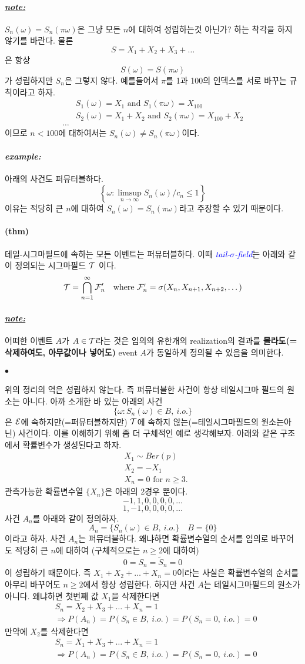 \documentclass[12pt,oneside,english]{book}
\def\ck{\paragraph{\Large$\bullet$}\Large}
\def\note{\paragraph{\Large\textit{\underline{note:}}}\Large}
\def\ex{\paragraph{\Large\textit{example:}}\Large}
\newcommand{\para}[1]{\paragraph{\Large(#1)}\Large}
\begin{document}
\note $S_n(\omega)=S_n(\pi\omega)$은 그냥 모든 $n$에 대하여 성립하는것 아닌가? 하는 착각을 하지 않기를 바란다. 물론 
\[
S=X_1+X_2+X_3+\dots
\]
은 항상 
\[
S(\omega)=S(\pi\omega)
\]가 성립하지만 $S_n$은 그렇지 않다. 예를들어서 $\pi$를 1과 100의 인덱스를 서로 바꾸는 규칙이라고 하자. 
\begin{align*}
& S_1(\omega)=X_1 \mbox{ and } S_1(\pi\omega)=X_{100} \\& S_2(\omega)=X_1+X_2 \mbox{ and } S_2(\pi\omega)=X_{100}+X_2 \\
\dots
\end{align*}
이므로 $n<100$에 대하여서는 $S_n(\omega)\neq S_n(\pi\omega)$이다. 

\ex 아래의 사건도 퍼뮤터블하다. 
\[
\left\{\omega:\limsup_{n\to\infty}S_n(\omega)/c_n \leq 1\right\}
\]
이유는 적당히 큰 $n$에 대하여 $S_n(\omega)=S_n(\pi\omega)$라고 주장할 수 있기 때문이다.

\para{thm} 테일-시그마필드에 속하는 모든 이벤트는 퍼뮤터블하다. 이때 \textcolor{blue}{\emph{tail-$\sigma$-field}}는 아래와 같이 정의되는 시그마필드 ${\cal T}$ 이다. 
\[
{\cal T}=\bigcap_{n=1}^{\infty}{\cal F}'_n \quad \mbox{where ${\cal F}'_n=\sigma(X_n,X_{n+1},X_{n+2},\dots)$}
\]

\note 어떠한 이벤트 $A$가 $A\in{\cal T}$라는 것은 임의의 유한개의 realization의 결과를 \textbf{몰라도(=삭제하여도, 아무값이나 넣어도)} event $A$가 동일하게 정의될 수 있음을 의미한다. 

\ck 위의 정리의 역은 성립하지 않는다. 즉 퍼뮤터블한 사건이 항상 테일시그마 필드의 원소는 아니다. 아까 소개한 바 있는 아래의 사건
\[
\{\omega:S_n(\omega) \in B, ~i.o.\}
\]
은 ${\cal E}$에 속하지만(=퍼뮤터블하지만) ${\cal T}$에 속하지 않는(=테일시그마필드의 원소는아닌) 사건이다. 이를 이해하기 위해 좀 더 구체적인 예로 생각해보자. 아래와 같은 구조에서 확률변수가 생성된다고 하자. 
\begin{align*}
& X_1 \sim Ber(p) \\ 
& X_2 = -X_1  \\ 
& X_n = 0 \mbox{ for } n\geq 3.
\end{align*}
관측가능한 확률변수열 $\{X_n\}$은 아래의 2경우 뿐이다. 
\[
-1,1,0,0,0,0,\dots
\] 
\[
1,-1,0,0,0,0,\dots
\] 
사건 $A_n$를 아래와 같이 정의하자. 
\[
A_n=\{S_n(\omega) \in B, ~ i.o.\} \quad B=\{0\}
\] 
이라고 하자. 사건 $A_n$는 퍼뮤터블하다. 왜냐하면 확률변수열의 순서를 임의로 바꾸어도 적당히 큰 $n$에 대하여 (구체적으로는 $n\geq 2$에 대하여) 
\[
0=S_n=\tilde{S}_n=0
\]
이 성립하기 때문이다. 즉 $X_1+X_2+\dots+X_n=0$이라는 사실은 확률변수열의 순서를 아무리 바꾸어도 $n\geq 2$에서 항상 성립한다. 하지만 사건 $A$는 테일시그마필드의 원소가 아니다. 왜냐하면 첫번째 값 $X_1$을 삭제한다면 
\begin{align*}
& S_n=X_2+X_3+\dots+X_n=1 \\
& \Longrightarrow P(A_n)=P(S_n \in B,~i.o.)=P(S_n=0, ~i.o.)=0
\end{align*}
만약에 $X_2$를 삭제한다면 
\begin{align*}
& S_n=X_1+X_3+\dots+X_n=1 \\
& \Longrightarrow P(A_n)=P(S_n \in B,~i.o.)=P(S_n=0, ~i.o.)=0
\end{align*}
\end{document}
